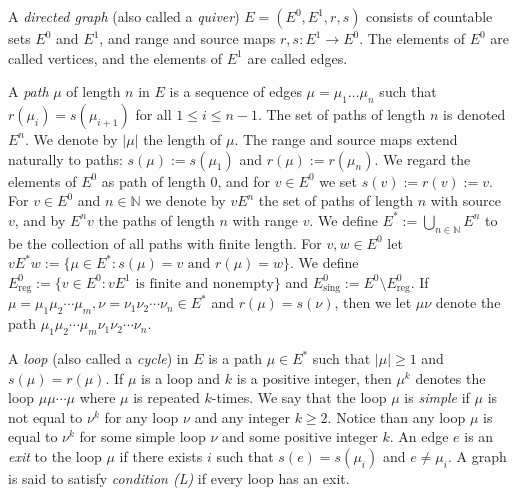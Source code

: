 \documentclass[12pt, a4paper]{amsart}
\numberwithin{equation}{section}
\theoremstyle{definition}
\theoremstyle{remark}
\begin{document}
A {\em directed graph} (also called a \emph{quiver}) $E=(E^0,E^1,r,s)$ consists of countable sets $E^0$ and $E^1$, and range and source maps $r,s:E^1\to E^0$. The elements of $E^0$ are called vertices, and the elements of $E^1$ are called edges. 

A {\em path} $\mu$ of length $n$ in $E$ is a sequence of edges $\mu=\mu_1\dots\mu_n$ such that $r(\mu_i)=s(\mu_{i+1})$ for all $1\le i\le n-1$. The set of paths of length $n$ is denoted $E^n$. We denote by $|\mu|$ the length of $\mu$. The range and source maps extend naturally to paths: $s(\mu):=s(\mu_1)$ and $r(\mu):=r(\mu_n)$. We regard the elements of $E^0$ as path of length 0, and for $v \in E^0$ we set $s(v):=r(v):=v$. For $v\in E^0$ and $n\in{\mathbb{N}}$ we denote by $vE^n$ the set of paths of length $n$ with source $v$, and by $E^nv$ the paths of length $n$ with range $v$. We define $E^*:=\bigcup_{n\in{\mathbb{N}}}E^n$ to be the collection of all paths with finite length. For $v,w\in E^0$ let $vE^*w:=\{\mu\in E^*:s(\mu)=v\text{ and }r(\mu)=w\}$. We define $E^0_{{\operatorname{reg}}}:=\{v\in E^0:vE^1\text{ is finite and nonempty}\}$ and $E^0_{{\operatorname{sing}}}:=E^0\setminus E^0_{{\operatorname{reg}}}$. If $\mu=\mu_1\mu_2\cdots\mu_m, \nu=\nu_1\nu_2\cdots\nu_n\in E^*$ and $r(\mu)=s(\nu)$, then we let $\mu\nu$ denote the path $\mu_1\mu_2\cdots\mu_m\nu_1\nu_2\cdots\nu_n$. 

A {\em loop} (also called a \emph{cycle}) in $E$ is a path $\mu\in E^*$ such that $|\mu|\ge 1$ and $s(\mu)=r(\mu)$. If $\mu$ is a loop and $k$ is a positive integer, then $\mu^k$ denotes the loop $\mu\mu\cdots\mu$ where $\mu$ is repeated $k$-times. We say that the loop $\mu$ is \emph{simple} if $\mu$ is not equal to $\nu^k$ for any loop $\nu$ and any integer $k\ge 2$. Notice than any loop $\mu$ is equal to $\nu^k$ for some simple loop $\nu$ and some positive integer $k$. An edge $e$ is an {\em exit} to the loop $\mu$ if there exists $i$ such that $s(e)=s(\mu_i)$ and $e\not=\mu_i$. A graph is said to satisfy \emph{condition (L)} if every loop has an exit. 
\end{document}
